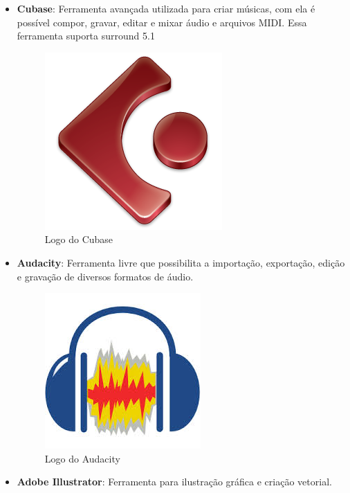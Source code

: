 \documentclass[11pt]{article} %
\begin{document}
\begin{itemize}
\item \textbf{Cubase}: Ferramenta avançada utilizada para criar músicas, com ela é possível compor, gravar, editar e mixar áudio e arquivos MIDI. Essa ferramenta suporta surround 5.1

\begin{figure}[!htp]
\centering
\includegraphics[scale=0.3]{imagens/cubase-Logo.png}
\caption{Logo do Cubase}
\label{Cubase}
\end{figure}

\item \textbf{Audacity}: Ferramenta livre que possibilita a importação, exportação, edição e gravação de diversos formatos de áudio.

\begin{figure}[!htp]
\centering
\includegraphics[scale=0.3]{imagens/audacity.jpg}
\caption{Logo do Audacity}
\label{Audacity}
\end{figure}

\item \textbf{Adobe Illustrator}: Ferramenta para ilustração gráfica e criação vetorial.


\end{itemize}
\end{document}
